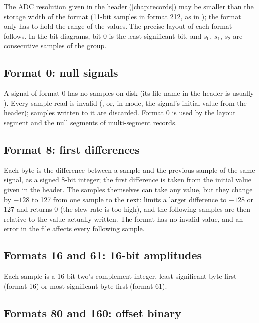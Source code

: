 The ADC resolution given in the header (\cref{chap:records}) may be smaller than the
storage width of the format (11-bit samples in format 212, as in ); the format
only has to hold the range of the values. The precise layout of each format follows. In
the bit diagrams, bit 0 is the least significant bit, and $s_0$, $s_1$, $s_2$ are
consecutive samples of the group.

\subsection{Format 0: null signals}
\label{sec:formats-0}

A signal of format 0 has no samples on disk (its file name in the header is usually
\code{\textasciitilde}). Every sample read is invalid (, or, in
 mode, the signal's initial value from the header); samples written to it
are discarded. Format 0 is used by the layout segment and the null segments of
multi-segment records.

\subsection{Format 8: first differences}
\label{sec:formats-8}

Each byte is the difference between a sample and the previous sample of the same signal,
as a signed 8-bit integer; the first difference is taken from the initial value given in
the header. The samples themselves can take any value, but they change by $-128$ to 127 from one
sample to the next:  limits a larger difference to $-128$ or 127 and returns 0 (the slew
rate is too high), and the following samples are then relative to the value
actually written. The format has no invalid value, and an error in the file affects every
following sample.

\subsection{Formats 16 and 61: 16-bit amplitudes}
\label{sec:formats-16}

Each sample is a 16-bit two's complement integer, least significant byte first (format 16)
or most significant byte first (format 61).

\subsection{Formats 80 and 160: offset binary}
\label{sec:formats-80}

